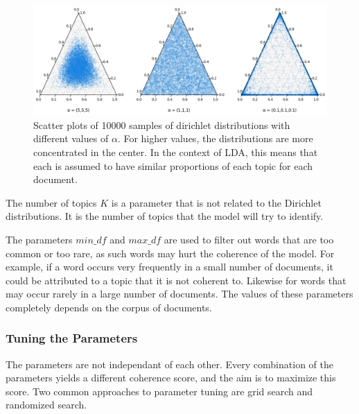 \begin{figure}[h]
    \centering
    \includegraphics[width=1\textwidth]{resources/dirichlet_example.png}
    \caption{Scatter plots of 10000 samples of dirichlet distributions with different values of $\alpha$. For higher values, the distributions are more concentrated in the center. In the context of LDA, this means that each is assumed to have similar proportions of each topic for each document.}
    \label{fig:spelling_error_distribution}
\end{figure}


The number of topics $K$ is a parameter that is not related to the Dirichlet distributions. It is the number of topics that the model will try to identify.

The parameters $min\_df$ and $max\_df$ are used to filter out words that are too common or too rare, as such words may hurt the coherence of the model. For example, if a word occurs very frequently in a small number of documents, it could be attributed to a topic that it is not coherent to. Likewise for words that may occur rarely in a large number of documents. The values of these parameters completely depends on the corpus of documents.

\subsubsection*{Tuning the Parameters}

The parameters are not independant of each other. Every combination of the parameters yields a different coherence score, and the aim is to maximize this score. Two common approaches to parameter tuning are grid search and randomized search. 

